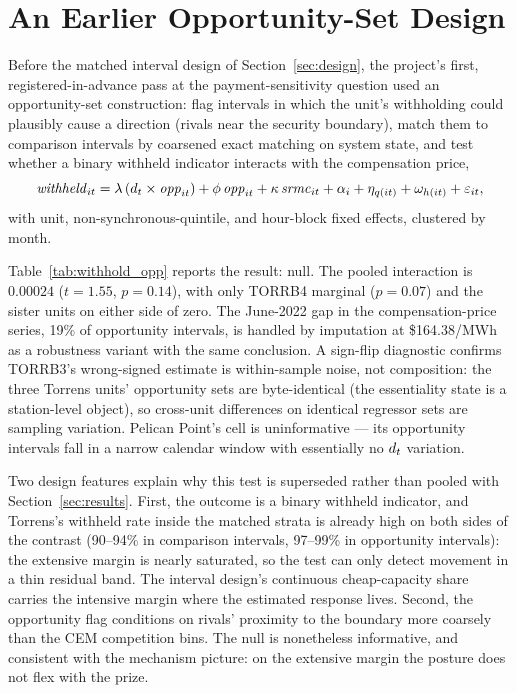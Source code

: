 \section{An Earlier Opportunity-Set Design}\label{app:withhold_opportunity}

Before the matched interval design of Section~\ref{sec:design}, the
project's first, registered-in-advance pass at the payment-sensitivity question used
an opportunity-set construction: flag intervals in which the unit's withholding
could plausibly cause a direction (rivals near the security boundary), match
them to comparison intervals by coarsened exact matching on system state, and
test whether a binary withheld indicator interacts with the compensation
price,
\[
\mathit{withheld}_{it} = \lambda\,(d_t \times \mathit{opp}_{it}) +
\phi\,\mathit{opp}_{it} + \kappa\,\mathit{srmc}_{it} + \alpha_i +
\eta_{q(it)} + \omega_{h(it)} + \varepsilon_{it},
\]
with unit, non-synchronous-quintile, and hour-block fixed effects, clustered
by month.

Table~\ref{tab:withhold_opp} reports the result: null. The pooled interaction
is $0.00024$ ($t=1.55$, $p=0.14$), with only TORRB4 marginal ($p=0.07$) and
the sister units on either side of zero. The June-2022 gap in the
compensation-price series, 19\% of opportunity intervals, is handled by
imputation at \$164.38/MWh as a robustness variant with the same conclusion.
A sign-flip diagnostic confirms TORRB3's wrong-signed estimate is
within-sample noise, not composition: the three Torrens units' opportunity
sets are byte-identical (the essentiality state is a station-level object),
so cross-unit differences on identical regressor sets are sampling variation.
Pelican Point's cell is uninformative --- its opportunity intervals fall in a
narrow calendar window with essentially no $d_t$ variation.

Two design features explain why this test is superseded rather than pooled
with Section~\ref{sec:results}. First, the outcome is a binary withheld
indicator, and Torrens's withheld rate inside the matched strata is already
high on both sides of the contrast (90--94\% in comparison intervals,
97--99\% in opportunity intervals): the extensive margin is nearly saturated,
so the test can only detect movement in a thin residual band. The interval design's
continuous cheap-capacity share carries the intensive margin where the
estimated response lives. Second, the opportunity flag conditions on rivals'
proximity to the boundary more coarsely than the CEM competition bins.
The null is nonetheless informative, and consistent with the mechanism
picture: on the extensive margin the posture does not flex with the prize.


